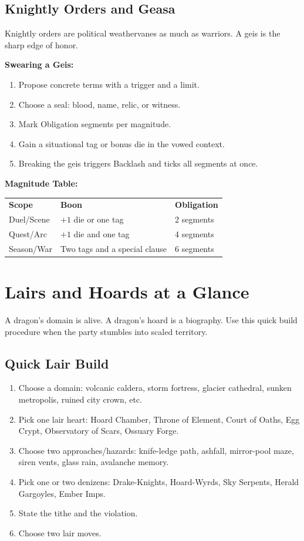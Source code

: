 \subsection*{Knightly Orders and Geasa}

Knightly orders are political weathervanes as much as warriors. A geis is the sharp edge of honor.

\noindent
\textbf{Swearing a Geis:}
\begin{enumerate}
  \item Propose concrete terms with a trigger and a limit.
  \item Choose a seal: blood, name, relic, or witness.
  \item Mark Obligation segments per magnitude.
  \item Gain a situational tag or bonus die in the vowed context.
  \item Breaking the geis triggers Backlash and ticks all segments at once.
\end{enumerate}

\noindent
\textbf{Magnitude Table:}
\begin{tabular}{lll}
  \textbf{Scope} & \textbf{Boon} & \textbf{Obligation} \\
  Duel/Scene & $+1$ die or one tag & 2 segments \\
  Quest/Arc & $+1$ die and one tag & 4 segments \\
  Season/War & Two tags and a special clause & 6 segments
\end{tabular}

\section{Lairs and Hoards at a Glance}

A dragon's domain is alive. A dragon's hoard is a biography. Use this quick build procedure when the party stumbles into scaled territory.

\subsection*{Quick Lair Build}

\begin{enumerate}
  \item Choose a domain: volcanic caldera, storm fortress, glacier cathedral, sunken metropolis, ruined city crown, etc.
  \item Pick one lair heart: Hoard Chamber, Throne of Element, Court of Oaths, Egg Crypt, Observatory of Scars, Ossuary Forge.
  \item Choose two approaches/hazards: knife-ledge path, ashfall, mirror-pool maze, siren vents, glass rain, avalanche memory.
  \item Pick one or two denizens: Drake-Knights, Hoard-Wyrds, Sky Serpents, Herald Gargoyles, Ember Imps.
  \item State the tithe and the violation.
  \item Choose two lair moves.
\end{enumerate}

